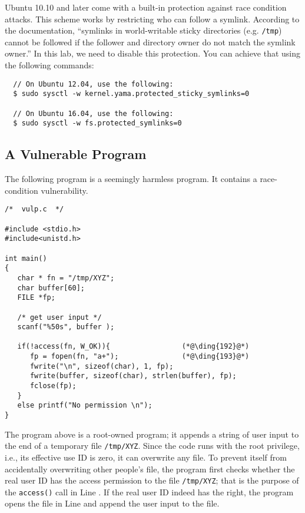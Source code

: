 Ubuntu 10.10 and later come with a built-in protection against race condition 
attacks. This scheme works by restricting who can follow a symlink. 
According to the documentation, ``symlinks in world-writable sticky 
directories (e.g. {\tt /tmp}) cannot be followed if the follower and directory 
owner do not match the symlink owner.''
In this lab, we need to disable this protection. You can achieve
that using the following commands:

\begin{lstlisting}
  // On Ubuntu 12.04, use the following:
  $ sudo sysctl -w kernel.yama.protected_sticky_symlinks=0

  // On Ubuntu 16.04, use the following:
  $ sudo sysctl -w fs.protected_symlinks=0
\end{lstlisting}



\subsection{A Vulnerable Program}


The following program is a seemingly harmless program. It contains a race-condition
vulnerability. 

\begin{lstlisting}
/*  vulp.c  */

#include <stdio.h>
#include<unistd.h>

int main()
{
   char * fn = "/tmp/XYZ";
   char buffer[60];
   FILE *fp;

   /* get user input */
   scanf("%50s", buffer );

   if(!access(fn, W_OK)){                 (*@\ding{192}@*)
      fp = fopen(fn, "a+");               (*@\ding{193}@*)
      fwrite("\n", sizeof(char), 1, fp);
      fwrite(buffer, sizeof(char), strlen(buffer), fp);
      fclose(fp);
   }
   else printf("No permission \n");
}
\end{lstlisting}

The program above is a root-owned \setuid program;
it appends a string of user input to
the end of a temporary file {\tt /tmp/XYZ}. Since the code runs
with the root privilege, i.e., its effective use ID is zero, it 
can overwrite any file. To prevent itself from accidentally
overwriting other people's file, the program first 
checks whether the real user ID has the access permission to the file
{\tt /tmp/XYZ}; that is the purpose of the {\tt access()} call in Line
.  If the real user ID indeed has 
the right, the program opens the file in Line  and append the user
input to the file. 

